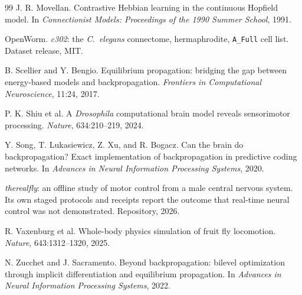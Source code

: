 \documentclass[11pt]{article}
\theoremstyle{remark}
\begin{document}
\begin{thebibliography}{99}
 J. R. Movellan. Contrastive Hebbian learning in the continuous Hopfield
model. In \emph{Connectionist Models: Proceedings of the 1990 Summer School}, 1991.

 OpenWorm. \emph{c302}: the \emph{C.~elegans} connectome, hermaphrodite,
\texttt{A\_Full} cell list. Dataset release, MIT.

 B. Scellier and Y. Bengio. Equilibrium propagation: bridging the gap between
energy-based models and backpropagation. \emph{Frontiers in Computational Neuroscience}, 11:24,
2017.

 P. K. Shiu et al. A \emph{Drosophila} computational brain model reveals sensorimotor
processing. \emph{Nature}, 634:210--219, 2024.

 Y. Song, T. Lukasiewicz, Z. Xu, and R. Bogacz. Can the brain do backpropagation?
Exact implementation of backpropagation in predictive coding networks. In \emph{Advances in Neural
Information Processing Systems}, 2020.

 \emph{therealfly}: an offline study of motor control from a male central
nervous system. Its own staged protocols and receipts report the outcome that real-time neural
control was not demonstrated. Repository, 2026.

 R. Vaxenburg et al. Whole-body physics simulation of fruit fly locomotion.
\emph{Nature}, 643:1312--1320, 2025.

 N. Zucchet and J. Sacramento. Beyond backpropagation: bilevel optimization
through implicit differentiation and equilibrium propagation. In \emph{Advances in Neural
Information Processing Systems}, 2022.

\end{thebibliography}
\end{document}
